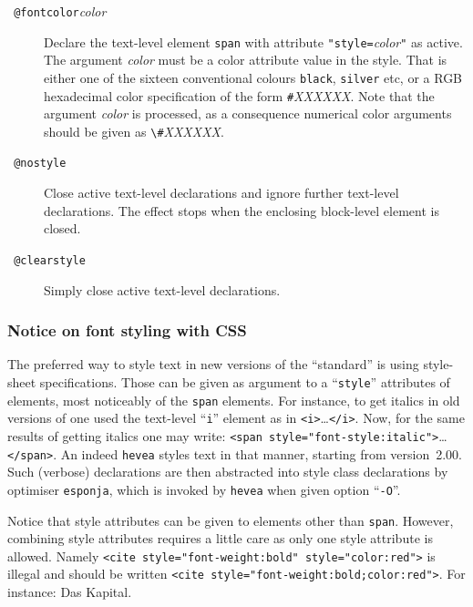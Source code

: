 \begin{description}
\item[{\tt{} @fontcolor}{\it color}{\tt{}}]
Declare the text-level element \verb+span+ with attribute
\verb+"style=+\textit{color}\verb+"+ as active.
The argument \textit{color} must be a color attribute value in the \html{}
style. That is either one of the sixteen conventional colours
\verb+black+, \verb+silver+ etc, or a RGB hexadecimal color specification
of the form
\verb+#+\textit{XXXXXX}.
Note that the argument \textit{color} is processed, as a consequence
numerical color arguments should be given as \verb+\#+\textit{XXXXXX}.



\item[{\tt{} @nostyle}]
Close active text-level declarations and ignore further text-level
declarations.
The effect stops when the enclosing block-level element is closed.
\item[{\tt{} @clearstyle}]
Simply close active text-level declarations.
\end{description}

\subsubsection*{Notice on font styling with CSS}

The preferred way to style text in new versions of the \html{} ``standard''
is using style-sheet specifications. Those can be given as argument to
a ``\texttt{style}'' attributes of \html{} elements, most noticeably
of the \texttt{span} elements.
For instance, to get italics in old versions of \html{} one used
the text-level ``\texttt{i}'' element as in
\verb+<i>+\ldots\verb+</i>+. Now, for the same results of getting
 italics one may write:
\verb+<span style="font-style:italic">+\ldots\verb+</span>+.
An indeed \texttt{hevea} styles text in that manner,
starting from version~2.00.
Such (verbose) declarations are then abstracted into style class declarations
by \hevea{} optimiser \texttt{esponja}, which is invoked by \texttt{hevea}
when given option ``\texttt{-O}''.

Notice that style attributes can be given to elements other than \texttt{span}.
However, combining style attributes requires a little care as only one style
attribute is allowed.
Namely \verb+<cite style="font-weight:bold" style="color:red">+
is illegal and should be written 
\verb+<cite style="font-weight:bold;color:red">+.
\ifhevea
For instance:
{Das Kapital}.
\fi

